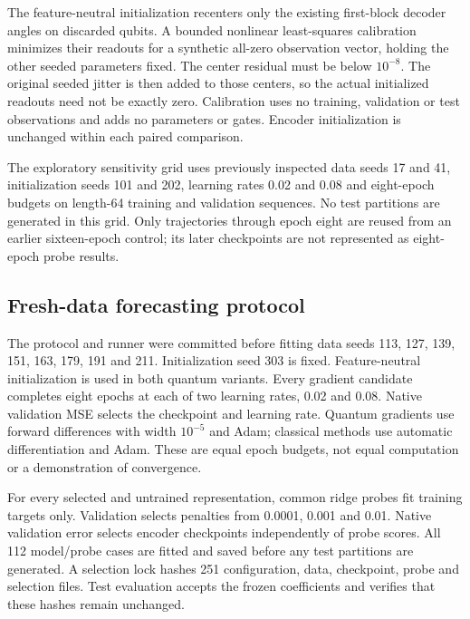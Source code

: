 \documentclass[
  11pt,
]{article}
\begin{document}
The feature-neutral initialization recenters only the existing
first-block decoder angles on discarded qubits. A bounded nonlinear
least-squares calibration minimizes their readouts for a synthetic
all-zero observation vector, holding the other seeded parameters fixed.
The center residual must be below \(10^{-8}\). The original seeded
jitter is then added to those centers, so the actual initialized
readouts need not be exactly zero. Calibration uses no training,
validation or test observations and adds no parameters or gates. Encoder
initialization is unchanged within each paired comparison.

The exploratory sensitivity grid uses previously inspected data seeds 17
and 41, initialization seeds 101 and 202, learning rates 0.02 and 0.08
and eight-epoch budgets on length-64 training and validation sequences.
No test partitions are generated in this grid. Only trajectories through
epoch eight are reused from an earlier sixteen-epoch control; its later
checkpoints are not represented as eight-epoch probe results.

\hypertarget{fresh-data-forecasting-protocol}{%
\subsection{Fresh-data forecasting
protocol}\label{fresh-data-forecasting-protocol}}

The protocol and runner were committed before fitting data seeds 113,
127, 139, 151, 163, 179, 191 and 211. Initialization seed 303 is fixed.
Feature-neutral initialization is used in both quantum variants. Every
gradient candidate completes eight epochs at each of two learning rates,
0.02 and 0.08. Native validation MSE selects the checkpoint and learning
rate. Quantum gradients use forward differences with width \(10^{-5}\)
and Adam; classical methods use automatic differentiation and Adam.
These are equal epoch budgets, not equal computation or a demonstration
of convergence.

For every selected and untrained representation, common ridge probes fit
training targets only. Validation selects penalties from 0.0001, 0.001
and 0.01. Native validation error selects encoder checkpoints
independently of probe scores. All 112 model/probe cases are fitted and
saved before any test partitions are generated. A selection lock hashes
251 configuration, data, checkpoint, probe and selection files. Test
evaluation accepts the frozen coefficients and verifies that these
hashes remain unchanged.
\end{document}
